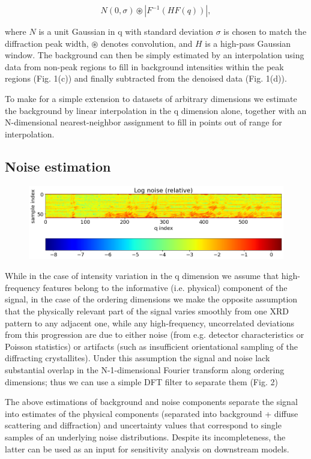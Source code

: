 \documentclass[12pt]{iopart}
\begin{document}
\begin{equation}
N(0, \sigma) \circledast |{F}^{-1}(H  {F}(q))|,
\end{equation}

where $N$ is a unit Gaussian in q with standard deviation $\sigma$
is chosen to match the diffraction peak width, $\circledast$ denotes
convolution, and $H$ is a high-pass Gaussian window. The background can
then be simply estimated by an interpolation using data from non-peak
regions to fill in background intensities within the peak regions (Fig.
1(c)) and finally subtracted from the denoised data (Fig. 1(d)).

To make for a simple extension to datasets of arbitrary dimensions we
estimate the background by linear interpolation in the q dimension
alone, together with an N-dimensional nearest-neighbor assignment to
fill in points out of range for interpolation.

\subsection{Noise estimation}
\begin{figure}
  \includegraphics[width=\linewidth]{figures/noise.png}
  \caption{}
  \label{fig:noise}
\end{figure}
While in the case of intensity variation in the q dimension we assume
that high-frequency features belong to the informative (i.e. physical)
component of the signal, in the case of the ordering dimensions we
make the opposite assumption that the physically relevant part of the
signal varies smoothly from one XRD pattern to any adjacent one, while
any high-frequency, uncorrelated deviations from this progression are
due to either noise (from e.g. detector characteristics or Poisson
statistics) or artifacts (such as insufficient orientational sampling
of the diffracting crystallites). Under this assumption the signal and
noise lack substantial overlap in the N-1-dimensional Fourier transform
along ordering dimensions; thus we can use a simple DFT filter to
separate them (Fig. 2)

The above estimations of background and noise components separate
the signal into estimates of the physical components (separated into
background + diffuse scattering and diffraction) and uncertainty values
that correspond to single samples of an underlying noise distributions.
Despite its incompleteness, the latter can be used as an input for
sensitivity analysis on downstream models.
\end{document}
